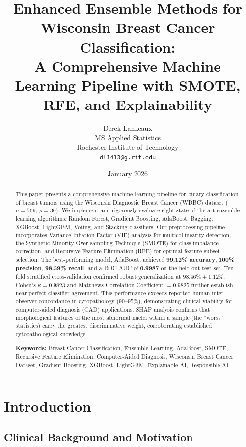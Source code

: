\documentclass[10pt,letterpaper]{article}
\title{\textbf{Enhanced Ensemble Methods for Wisconsin Breast Cancer Classification:\\
A Comprehensive Machine Learning Pipeline with SMOTE, RFE, and Explainability}}
\author{
  Derek Lankeaux\\
  MS Applied Statistics\\
  Rochester Institute of Technology\\
  \texttt{dl1413@g.rit.edu}
}
\date{January 2026}
\begin{document}
\maketitle

\begin{abstract}
This paper presents a comprehensive machine learning pipeline for binary classification of breast
tumors using the Wisconsin Diagnostic Breast Cancer (WDBC) dataset ($n=569$, $p=30$). We
implement and rigorously evaluate eight state-of-the-art ensemble learning algorithms: Random
Forest, Gradient Boosting, AdaBoost, Bagging, XGBoost, LightGBM, Voting, and Stacking
classifiers. Our preprocessing pipeline incorporates Variance Inflation Factor (VIF) analysis for
multicollinearity detection, the Synthetic Minority Over-sampling Technique (SMOTE) for class
imbalance correction, and Recursive Feature Elimination (RFE) for optimal feature subset
selection. The best-performing model, AdaBoost, achieved \textbf{99.12\% accuracy},
\textbf{100\% precision}, \textbf{98.59\% recall}, and a ROC-AUC of \textbf{0.9987} on the
held-out test set. Ten-fold stratified cross-validation confirmed robust generalization at
$98.46\% \pm 1.12\%$. Cohen's $\kappa = 0.9823$ and Matthews Correlation Coefficient $= 0.9825$
further establish near-perfect classifier agreement. This performance exceeds reported
human inter-observer concordance in cytopathology ($90$--$95\%$), demonstrating clinical
viability for computer-aided diagnosis (CAD) applications. SHAP analysis confirms that
morphological features of the most abnormal nuclei within a sample (the ``worst'' statistics)
carry the greatest discriminative weight, corroborating established cytopathological knowledge.

\smallskip
\noindent\textbf{Keywords:} Breast Cancer Classification, Ensemble Learning, AdaBoost, SMOTE,
Recursive Feature Elimination, Computer-Aided Diagnosis, Wisconsin Breast Cancer Dataset,
Gradient Boosting, XGBoost, LightGBM, Explainable AI, Responsible AI
\end{abstract}

\section{Introduction}

\subsection{Clinical Background and Motivation}
\end{document}
